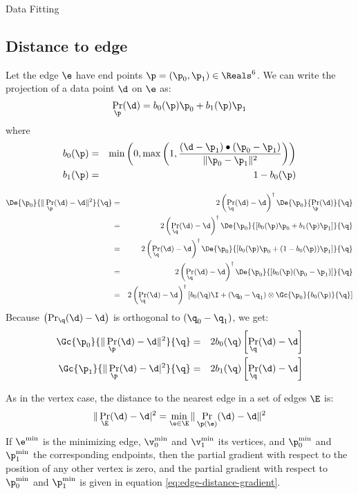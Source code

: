 \begin{plSection}{Data Fitting}
\subsection{Distance to edge}
\label{sec:Distance-to-edge}

Let the edge $\e$ have end points $\p = (\p_0, \p_1) \in \Reals^6$.
We can write the projection of a data point $\d$ on $\e$ as:
\begin{equation}
\Pr_\p (\d) = b_0(\p) \p_0 + b_1(\p) \p_1
\end{equation}
where
\begin{eqnarray}
b_0(\p) & = &
\min\left(0,\max\left(1,
{{ (\d - \p_1) \bullet (\p_0 - \p_1) }
\over
{ \| \p_0 - \p_1 \|^2 }
}\right) \right) \\
b_1(\p) & = & 1 - b_0(\p)
\nonumber
\end{eqnarray}

\begin{eqnarray}
\label{eq:edge-distance-gradient-derivation}
\De{\p_0}{ \| \Pr_{\p} (\d) - \d \|^2 }{\q}
& = &
2 \left( \Pr_{\q} (\d) - \d \right)^\dagger
\De{\p_0}{\Pr_{\p} (\d) }{\q}
\\
& = &
2 \left( \Pr_{\q} (\d) - \d \right)^\dagger
\De{\p_0}{\left[ b_0(\p)\p_0 + b_1(\p)\p_1 \right]}{\q}
\nonumber \\
& = &
2 \left( \Pr_{\q} (\d) - \d \right)^\dagger
\De{\p_0}{\left[ b_0(\p)\p_0 + (1 - b_0(\p))\p_1 \right]}{\q}
\nonumber \\
& = &
2 \left( \Pr_{\q} (\d) - \d \right)^\dagger
\De{\p_0}{\left[ b_0(\p)(\p_0 - \p_1) \right]}{\q}
\nonumber \\
& = &
2 \left( \Pr_{\q} (\d) - \d \right)^\dagger
\left[ b_0(\q) \I + (\q_0 - \q_1) \otimes \Gc{\p_0}{b_0(\p)}{\q} \right]
\nonumber
\end{eqnarray}
Because $\left( \Pr_{\q} (\d) - \d \right)$ is orthogonal to
$\left( \q_0 - \q_1 \right)$, we get:
\begin{eqnarray}
\label{eq:edge-distance-gradient}
\Gc{\p_0}{ \| \Pr_{\p} (\d) - \d \|^2 }{\q}
& = & 2 b_0(\q) \left[ \Pr_{\q} (\d) - \d \right]
\\
\Gc{\p_1}{ \| \Pr_{\p} (\d) - \d|^2 }{\q}
& = & 2 b_1(\q) \left[ \Pr_\q (\d) - \d \right]
\nonumber
\end{eqnarray}

As in the vertex case,
the distance to the nearest edge in a set of edges $\E$ is:
\begin{equation}
\| \Pr_{\E} (\d) - \d|^2 = \min_{\e \in \E} \| \Pr_{\p(\e)}(\d) - \d \|^2
\end{equation}
If $\e^{\min}$ is the minimizing edge,
$\v_0^{\min}$ and $\v_1^{\min}$ its vertices,
and $\p_0^{\min}$ and $\p_1^{\min}$
the corresponding endpoints,
then the partial gradient with respect to
the position of any
other vertex is zero,
and the partial gradient with respect to $\p_0^{\min}$ and $\p_1^{\min}$
is given in equation \ref{eq:edge-distance-gradient}.


\end{plSection}
